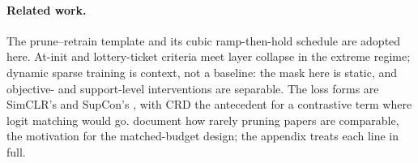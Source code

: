 \paragraph{Related work.} The prune--retrain template and its cubic
ramp-then-hold schedule \citep{han2015learning,zhu2018prune,gale2019state} are
adopted here. At-init and lottery-ticket
criteria \citep{frankle2019lottery,wang2020grasp,tanaka2020synflow} meet layer
collapse in the extreme regime; dynamic sparse training
\citep{mocanu2018set,evci2020rigl,liu2021granet,li2025east} is context, not a
baseline: the mask here is static, and objective- and support-level
interventions are separable. The loss forms are SimCLR's and SupCon's
\citep{chen2020simclr,khosla2020supcon}, with CRD \citep{tian2020crd} the
antecedent for a contrastive term where logit matching
\citep{hinton2015distilling} would go. \citet{blalock2020state} document how
rarely pruning papers are comparable, the motivation for the matched-budget
design; the appendix treats each line in full.
